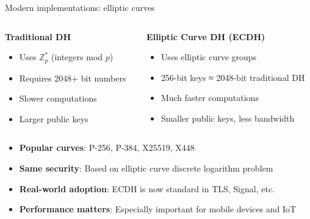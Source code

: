 \documentclass[aspectratio=169, lualatex, handout]{beamer}
\begin{document}
\begin{frame}{Modern implementations: elliptic curves}
	\begin{columns}[c]
		\begin{column}{0.5\textwidth}
			\textbf{Traditional DH}
			\begin{itemize}[<+->]
				\item Uses $\mathbb{Z}_p^*$ (integers mod $p$)
				\item Requires 2048+ bit numbers
				\item Slower computations
				\item Larger public keys
			\end{itemize}
		\end{column}
		\begin{column}{0.5\textwidth}
			\textbf{Elliptic Curve DH (ECDH)}
			\begin{itemize}[<+->]
				\item Uses elliptic curve groups
				\item 256-bit keys ≈ 2048-bit traditional DH
				\item Much faster computations
				\item Smaller public keys, less bandwidth
			\end{itemize}
		\end{column}
	\end{columns}
	\vspace{0.5cm}
	\begin{itemize}[<+->]
		\item \textbf{Popular curves}: P-256, P-384, X25519, X448
		\item \textbf{Same security}: Based on elliptic curve discrete logarithm problem
		\item \textbf{Real-world adoption}: ECDH is now standard in TLS, Signal, etc.
		\item \textbf{Performance matters}: Especially important for mobile devices and IoT
	\end{itemize}
\end{frame}
\end{document}
